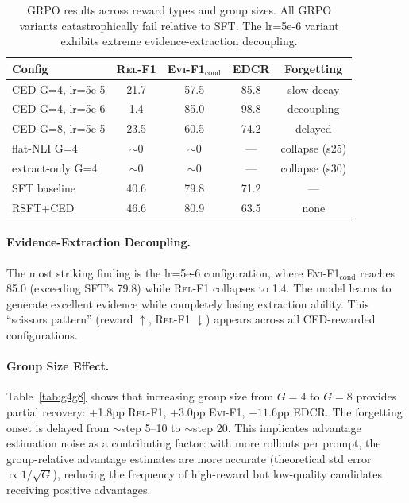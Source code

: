 \documentclass[11pt,a4paper]{article}
\newcommand{\evi}{\textsc{Evi-F1}}
\newcommand{\edcr}{\textsc{EDCR}}
\newcommand{\relf}{\textsc{Rel-F1}}
\begin{document}
\begin{table}[t]
\centering
\small
\begin{tabular}{lcccc}
\toprule
\textbf{Config} & \textbf{\relf{}} & \textbf{\evi{}$_\text{cond}$} & \textbf{\edcr{}} & \textbf{Forgetting} \\
\midrule
CED G=4, lr=5e-5 & 21.7 & 57.5 & 85.8 & slow decay \\
CED G=4, lr=5e-6 & 1.4 & 85.0 & 98.8 & decoupling \\
CED G=8, lr=5e-5 & 23.5 & 60.5 & 74.2 & delayed \\
flat-NLI G=4 & $\sim$0 & $\sim$0 & --- & collapse (s25) \\
extract-only G=4 & $\sim$0 & $\sim$0 & --- & collapse (s30) \\
\midrule
SFT baseline & 40.6 & 79.8 & 71.2 & --- \\
RSFT+CED & 46.6 & 80.9 & 63.5 & none \\
\bottomrule
\end{tabular}
\caption{GRPO results across reward types and group sizes. All GRPO variants catastrophically fail relative to SFT. The lr=5e-6 variant exhibits extreme evidence-extraction decoupling.}
\label{tab:grpo_summary}
\end{table}

\paragraph{Evidence-Extraction Decoupling.}
The most striking finding is the lr=5e-6 configuration, where \evi{}$_\text{cond}$ reaches 85.0 (exceeding SFT's 79.8) while \relf{} collapses to 1.4. The model learns to generate excellent evidence while completely losing extraction ability. This ``scissors pattern'' (reward $\uparrow$, \relf{} $\downarrow$) appears across all CED-rewarded configurations.

\paragraph{Group Size Effect.}
Table~\ref{tab:g4g8} shows that increasing group size from $G{=}4$ to $G{=}8$ provides partial recovery: +1.8pp \relf{}, +3.0pp \evi{}, $-11.6$pp \edcr{}. The forgetting onset is delayed from $\sim$step 5--10 to $\sim$step 20. This implicates advantage estimation noise as a contributing factor: with more rollouts per prompt, the group-relative advantage estimates are more accurate (theoretical std error $\propto 1/\sqrt{G}$), reducing the frequency of high-reward but low-quality candidates receiving positive advantages.
\end{document}
